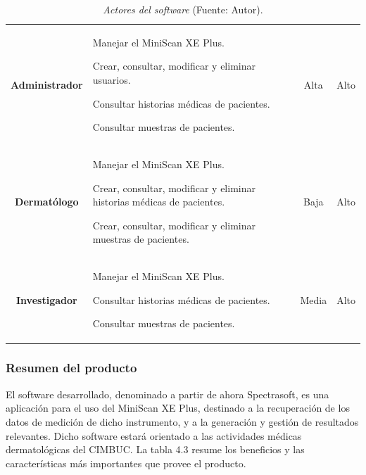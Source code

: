 	\begin{table}[h]
		\small
		\caption[Actores del software]{\textit{Actores del software} (Fuente: Autor).}
		\centering
		\setlength{\extrarowheight}{\altocelda}
		\begin{tabulary}{\anchotabla}{|c|J|c|c|}
			\hline
			 &  &  & \\ \hline
			
			\textbf{Administrador} &
			
			Manejar el MiniScan XE Plus.
			
			Crear, consultar, modificar y eliminar usuarios.
			
			Consultar historias m\'{e}dicas de pacientes.
			
			Consultar muestras de pacientes. &
			Alta &
			Alto\\ \hline
			
			\textbf{Dermat\'{o}logo} &
			
			Manejar el MiniScan XE Plus.
			
			Crear, consultar, modificar y eliminar historias m\'{e}dicas de pacientes.
			
			Crear, consultar, modificar y eliminar muestras de pacientes. &
			Baja &
			Alto\\ \hline
			
			\textbf{Investigador} &
			
			Manejar el MiniScan XE Plus.
			
			Consultar historias m\'{e}dicas de pacientes.
			
			Consultar muestras de pacientes. &
			Media &
			Alto\\ \hline
		\end{tabulary}
	\end{table}
	
	\subsubsection{Resumen del producto}
	
	El software desarrollado, denominado a partir de ahora Spectrasoft, es una aplicaci\'{o}n para el uso del MiniScan XE Plus, destinado a la recuperaci\'{o}n de los datos de medici\'{o}n de dicho instrumento, y a la generaci\'{o}n y gesti\'{o}n de resultados relevantes. Dicho software estar\'{a} orientado a las actividades m\'{e}dicas dermatol\'{o}gicas del CIMBUC. La tabla 4.3 resume los beneficios y las caracter\'{i}sticas m\'{a}s importantes que provee el producto.
	
